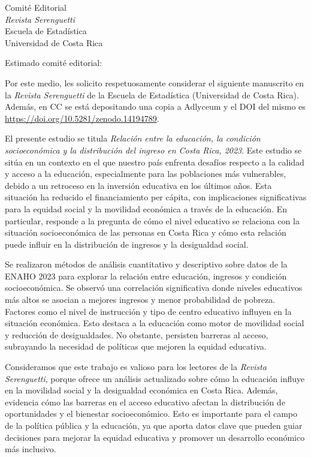 \documentclass[11pt]{letter}
\date{\today}
\begin{document}
\begin{letter}{Comité Editorial\\ \textit{Revista Serenguetti}\\ Escuela de Estadística\\ Universidad de Costa Rica}

\opening{Estimado comité editorial:}

Por este medio, les solicito respetuosamente considerar el siguiente manuscrito en la \textit{Revista Serenguetti} de la Escuela de Estadística (Universidad de Costa Rica). Además, en CC se está depositando una copia a Adlyceum y el DOI del mismo es \href{https://doi.org/10.5281/zenodo.14194789}{https://doi.org/10.5281/zenodo.14194789}.

El presente estudio se titula \textit{Relación entre la educación, la condición socioeconómica y la distribución del ingreso en Costa Rica, 2023}. Este estudio se sitúa en un contexto en el que nuestro país enfrenta desafíos respecto a la calidad y acceso a la educación, especialmente para las poblaciones más vulnerables, debido a un retroceso en la inversión educativa en los últimos años. Esta situación ha reducido el financiamiento per cápita, con implicaciones significativas para la equidad social y la movilidad económica a través de la educación. En particular, responde a la pregunta de cómo el nivel educativo se relaciona con la situación socioeconómica de las personas en Costa Rica y cómo esta relación puede influir en la distribución de ingresos y la desigualdad social.

Se realizaron métodos de análisis cuantitativo y descriptivo sobre datos de la ENAHO 2023 para explorar la relación entre educación, ingresos y condición socioeconómica. Se observó una correlación significativa donde niveles educativos más altos se asocian a mejores ingresos y menor probabilidad de pobreza. Factores como el nivel de instrucción y tipo de centro educativo influyen en la situación económica. Esto destaca a la educación como motor de movilidad social y reducción de desigualdades. No obstante, persisten barreras al acceso, subrayando la necesidad de políticas que mejoren la equidad educativa.

Consideramos que este trabajo es valioso para los lectores de la \textit{Revista Serenguetti}, porque ofrece un análisis actualizado sobre cómo la educación influye en la movilidad social y la desigualdad económica en Costa Rica. Además, evidencia cómo las barreras en el acceso educativo afectan la distribución de oportunidades y el bienestar socioeconómico. Esto es importante para el campo de la política pública y la educación, ya que aporta datos clave que pueden guiar decisiones para mejorar la equidad educativa y promover un desarrollo económico más inclusivo.


\end{letter}
\end{document}

